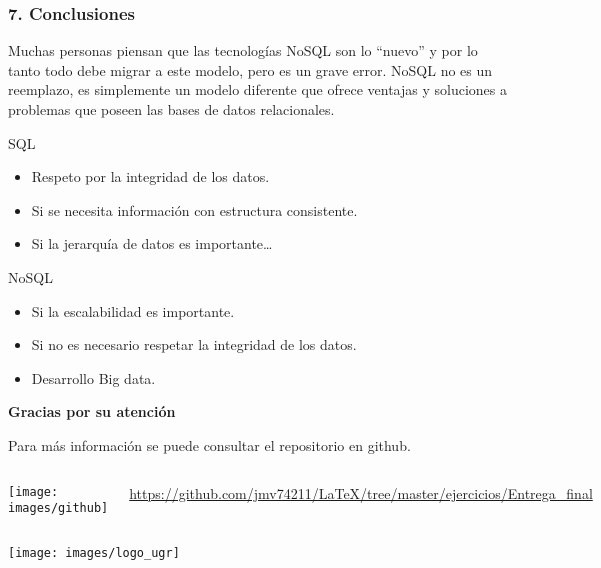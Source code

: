 \documentclass{beamer}
\begin{document}
\begin{frame}
	
	\frametitle{7. Conclusiones}
	
	Muchas personas piensan que las tecnologías NoSQL son lo “nuevo” y por lo tanto todo
	debe migrar a este modelo, pero es un grave error. NoSQL no es un reemplazo, es simplemente un modelo diferente que ofrece ventajas y soluciones a problemas que poseen
	las bases de datos relacionales.
	
	\begin{block}{SQL}
		\begin{itemize}
			\item Respeto por la integridad de los datos.
			\item Si se necesita información con estructura consistente.
			\item Si la jerarquía de datos es importante\ldots
		\end{itemize}
	\end{block}
	
	\begin{block}{NoSQL}
			\begin{itemize}
				\item Si la escalabilidad es importante.
				\item Si no es necesario respetar la integridad de los datos.
				\item Desarrollo Big data.
			\end{itemize}
		\end{block}
	
\end{frame}


\begin{frame}
	\LARGE
	\centering
	\textbf{Gracias por su atención}
	\large 
	
	Para más información se puede consultar el repositorio en github.
	
	\begin{columns}
		\column{3cm}
		\centering
		\texttt{[image: images/github]}
		
		
		\column{8cm}
		\small
		 \color[rgb]{0,0,1} \url{https://github.com/jmv74211/LaTeX/tree/master/ejercicios/Entrega\_final}
				
	\end{columns}
	
	\vspace{1cm}
	\texttt{[image: images/logo\_ugr]}

\end{frame}
\end{document}
